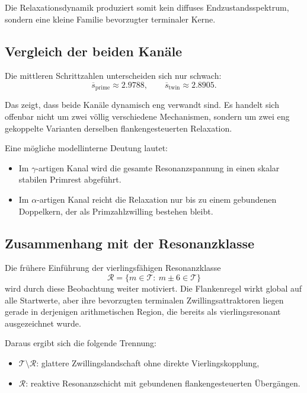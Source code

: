 \documentclass[11pt,a4paper]{article}
\theoremstyle{definition}
\theoremstyle{plain}
\theoremstyle{remark}
\begin{document}
	Die Relaxationsdynamik produziert somit kein diffuses Endzustandsspektrum, sondern eine kleine Familie bevorzugter terminaler Kerne.
	
	\subsection{Vergleich der beiden Kanäle}
	
	Die mittleren Schrittzahlen unterscheiden sich nur schwach:
	\[
	\overline{s}_{\mathrm{prime}} \approx 2.9788,
	\qquad
	\overline{s}_{\mathrm{twin}} \approx 2.8905.
	\]
	
	Das zeigt, dass beide Kanäle dynamisch eng verwandt sind. 
	Es handelt sich offenbar nicht um zwei völlig verschiedene Mechanismen, sondern um zwei eng gekoppelte Varianten derselben flankengesteuerten Relaxation.
	
	Eine mögliche modellinterne Deutung lautet:
	
	\begin{itemize}
		\item Im \(\gamma\)-artigen Kanal wird die gesamte Resonanzspannung in einen skalar stabilen Primrest abgeführt.
		\item Im \(\alpha\)-artigen Kanal reicht die Relaxation nur bis zu einem gebundenen Doppelkern, der als Primzahlzwilling bestehen bleibt.
	\end{itemize}
	
	\subsection{Zusammenhang mit der Resonanzklasse}
	
	Die frühere Einführung der vierlingsfähigen Resonanzklasse
	\[
	\mathcal R
	=
	\{m\in\mathcal T:\ m\pm 6\in\mathcal T\}
	\]
	wird durch diese Beobachtung weiter motiviert. 
	Die Flankenregel wirkt global auf alle Startwerte, aber ihre bevorzugten terminalen Zwillingsattraktoren liegen gerade in derjenigen arithmetischen Region, die bereits als vierlingsresonant ausgezeichnet wurde.
	
	Daraus ergibt sich die folgende Trennung:
	
	\begin{itemize}
		\item \(\mathcal T\setminus \mathcal R\): glattere Zwillingslandschaft ohne direkte Vierlingskopplung,
		\item \(\mathcal R\): reaktive Resonanzschicht mit gebundenen flankengesteuerten Übergängen.
	\end{itemize}
	
\end{document}
